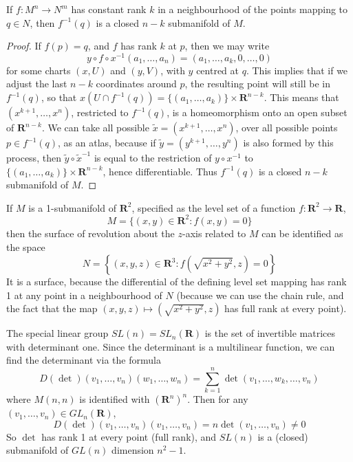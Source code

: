 \begin{theorem}
    If $f: M^n \to N^m$ has constant rank $k$ in a neighbourhood of the points mapping to $q \in N$, then $f^{-1}(q)$ is a closed $n - k$ submanifold of $M$.
\end{theorem}
\begin{proof}
    If $f(p) = q$, and $f$ has rank $k$ at $p$, then we may write
    \[ y \circ f \circ x^{-1}(a_1, \dots, a_n) = (a_1, \dots, a_k, 0 ,\dots, 0) \]
    for some charts $(x,U)$ and $(y,V)$, with $y$ centred at $q$. This implies that if we adjust the last $n - k$ coordinates around $p$, the resulting point will still be in $f^{-1}(q)$, so that $x(U \cap f^{-1}(q)) = \{ (a_1, \dots, a_k) \} \times \mathbf{R}^{n-k}$. This means that $(x^{k+1}, \dots, x^n)$, restricted to $f^{-1}(q)$, is a homeomorphism onto an open subset of $\mathbf{R}^{n-k}$. We can take all possible $\tilde{x} = (x^{k+1}, \dots, x^n)$, over all possible points $p \in f^{-1}(q)$, as an atlas, because if $\tilde{y} = (y^{k+1}, \dots, y^n)$ is also formed by this process, then $\tilde{y} \circ \tilde{x}^{-1}$ is equal to the restriction of $y \circ x^{-1}$ to $\{ (a_1, \dots, a_k) \} \times \mathbf{R}^{n-k}$, hence differentiable. Thus $f^{-1}(q)$ is a closed $n - k$ submanifold of $M$.
\end{proof}

\begin{example}
    If $M$ is a 1-submanifold of $\mathbf{R}^2$, specified as the level set of a function $f: \mathbf{R}^2 \to \mathbf{R}$,
    \[ M = \{ (x,y) \in \mathbf{R}^2: f(x,y) = 0 \} \]
    then the surface of revolution about the $z$-axis related to $M$ can be identified as the space
    \[ N = \left\{ (x,y,z) \in \mathbf{R}^3: f \left( \sqrt{x^2 + y^2}, z \right) = 0 \right\} \]
    It is a surface, because the differential of the defining level set mapping has rank 1 at any point in a neighbourhood of $N$ (because we can use the chain rule, and the fact that the map $(x,y,z) \mapsto (\sqrt{x^2 + y^2}, z)$ has full rank at every point).
\end{example}

\begin{example}
    The special linear group $SL(n) = SL_n(\mathbf{R})$ is the set of invertible matrices with determinant one. Since the determinant is a multilinear function, we can find the determinant via the formula
    \[ D(\det)(v_1, \dots, v_n)(w_1, \dots, w_n) = \sum_{k = 1}^n \det(v_1, \dots, w_k, \dots, v_n) \]
    where $M(n,n)$ is identified with $(\mathbf{R}^n)^n$. Then for any $(v_1, \dots, v_n) \in GL_n(\mathbf{R})$,
    \[ D(\det)(v_1, \dots, v_n)(v_1, \dots, v_n) = n \det(v_1, \dots, v_n) \neq 0 \]
    So $\det$ has rank 1 at every point (full rank), and $SL(n)$ is a (closed) submanifold of $GL(n)$ dimension $n^2 - 1$.
\end{example}


